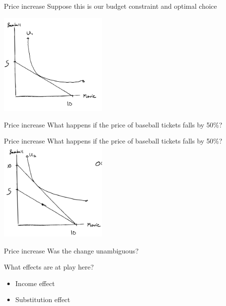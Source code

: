 \documentclass[aspectratio=169]{beamer}
\begin{document}

\begin{frame}{Price increase}
    Suppose this is our budget constraint and optimal choice

    \centering
        \includegraphics[width = 0.4\textwidth,keepaspectratio]{OC1.png}

\end{frame}

\begin{frame}{Price increase}
    What happens if the price of baseball tickets falls by 50\%?

\end{frame}

\begin{frame}{Price increase}
    What happens if the price of baseball tickets falls by 50\%?
    \centering
        \includegraphics[width = 0.4\textwidth,keepaspectratio]{OC2.png}
\end{frame}




\begin{frame}{Price increase}
    Was the change unambiguous?

    \vspace{2mm}

    What effects are at play here?
    \begin{itemize}
        \item Income effect
        \item Substitution effect
    \end{itemize}
\end{frame}
\end{document}
